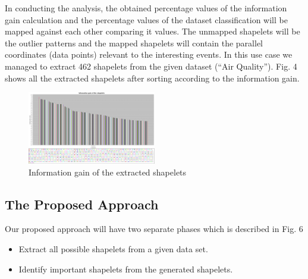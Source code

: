 \documentclass[letterpaper, 10 pt, conference]{IEEEtran}  %
\begin{document}
In conducting the analysis, the obtained percentage values of the information gain calculation and the percentage values of the dataset classification will be mapped against each other comparing it values. The unmapped shapelets will be the outlier patterns and the mapped shapelets will contain the parallel coordinates (data points) relevant to the interesting events. In this use case we managed to extract 462 shapelets from the given dataset (“Air Quality”).  Fig. 4 shows all the extracted shapelets after sorting according to the information gain.
\begin{figure}[h!]
\includegraphics[width=0.5\textwidth]{shapeletGraph.png}
\caption{Information gain of the extracted shapelets}
\end{figure}


\subsection{The Proposed Approach}
Our proposed approach will have two separate phases which is described in Fig. 6

\begin{itemize}
\item Extract all possible shapelets from a given data set.
\item Identify important shapelets from the generated shapelets.
\end{itemize}
\end{document}
